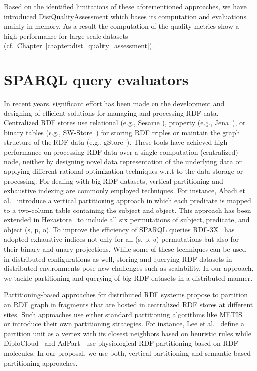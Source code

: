 Based on the identified limitations of these aforementioned approaches, we have introduced DistQualityAssessment which bases its computation and evaluations mainly in-memory.
As a result the computation of the quality metrics show a high performance for large-scale datasets (cf.\ Chapter~\ref{chapter:dist_quality_assessment}).

\section{SPARQL query evaluators}

In recent years, significant effort has been made on the development and designing of efficient solutions for managing and processing \gls{RDF} data.
Centralized \gls{RDF} stores use relational (e.g., Sesame \cite{BroekstraKH02}), property (e.g., Jena~\cite{Wilkinson06}), or binary tables (e.g., SW-Store~\cite{AbadiMMH09}) for storing \gls{RDF} triples or maintain the graph structure of the \gls{RDF} data (e.g., gStore~\cite{ZouMCOZ11}).
These tools have achieved high performance on processing \gls{RDF} data over a single computation (centralized) node, neither by designing novel data representation of the underlying data or applying different rational optimization techniques w.r.t to the data storage or processing.
For dealing with big \gls{RDF} datasets, vertical partitioning and exhaustive indexing are commonly employed techniques. 
For instance, Abadi et al.~\cite{AbadiMMH07} introduce a vertical partitioning approach in which each predicate is mapped to a two-column table containing the subject and object. 
This approach has been extended in Hexastore~\cite{WeissKB08} to include all six permutations of subject, predicate, and object (s, p, o). 
To improve the efficiency of \gls{SPARQL} queries RDF-3X~\cite{NeumannW10} has adopted exhaustive indices not only for all (s, p, o) permutations but also for their binary and unary projections. 
While some of these techniques can be used in distributed configurations as well, storing and querying \gls{RDF} datasets in distributed environments pose new challenges such as scalability. 
In our approach, we tackle partitioning and querying of big \gls{RDF} datasets in a distributed manner.

Partitioning-based approaches for distributed \gls{RDF} systems propose to partition an \gls{RDF} graph in fragments that are hosted in centralized \gls{RDF} stores at different sites. 
Such approaches use either standard partitioning algorithms like METIS~\cite{GurajadaSMT14} or introduce their own partitioning strategies. 
For instance, Lee et al.~\cite{LeeL2013} define a partition unit as a vertex with its closest neighbors based on heuristic rules while DiploCloud~\cite{WylotC16} and AdPart~\cite{harbi2016accelerating} use physiological \gls{RDF} partitioning based on \gls{RDF} molecules. 
In our proposal, we use both, vertical partitioning and semantic-based partitioning approaches.

